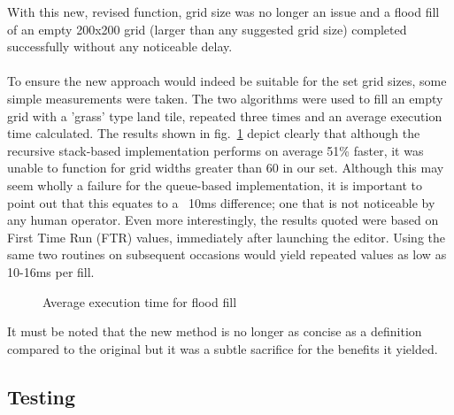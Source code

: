 With this new, revised function, grid size was no longer an issue and a flood fill of an empty 200x200 grid (larger than any suggested grid size) completed successfully without any noticeable delay.
\paragraph{}
To ensure the new approach would indeed be suitable for the set grid sizes, some simple measurements were taken. The two algorithms were used to fill an empty grid with a 'grass' type land tile, repeated three times and an average execution time calculated. The results shown in fig.~\ref{fig:floodChart} depict clearly that although the recursive stack-based implementation performs on average 51\% faster, it was unable to function for grid widths greater than 60 in our set. Although this may seem wholly a failure for the queue-based implementation, it is important to point out that this equates to a ~10ms difference; one that is not noticeable by any human operator.  Even more interestingly, the results quoted were based on First Time Run (FTR) values, immediately after launching the editor. Using the same two routines on subsequent occasions would yield repeated values as low as 10-16ms per fill.
 
\begin{figure}[h]
\centering
{}
\caption{Average execution time for flood fill}
\label{fig:floodChart}
\end{figure}

It must be noted that the new method is no longer as concise as a definition compared to the original but it was a subtle sacrifice for the benefits it yielded.

\subsection{Testing}

